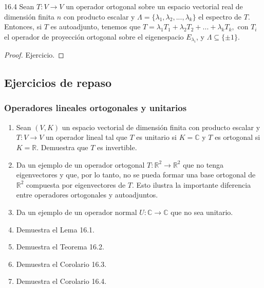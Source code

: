 \documentclass[12pt,libertine]{book}
\begin{document}
\begin{Coro} {16.4}
    Sean $T:V\to V$ un operador ortogonal sobre un espacio vectorial real de dimensión finita $n$ con producto escalar y $\Lambda=\{\lambda_1,\lambda_2,... , \lambda_k\}$ el espectro de $T$. Entonces, si $T$ es autoadjunto, tenemos que $T = \lambda_1 T_1 + \lambda_2 T_2 + ... + \lambda_k T_k,$ con $T_i$ el operador de proyección ortogonal sobre el eigenespacio $E_{\lambda_i}$, y $\Lambda\subseteq\{\pm 1\}$.

    \begin{proof}
        Ejercicio.
    \end{proof}
       
\end{Coro}

\subsection*{Ejercicios de repaso}

\subsubsection*{Operadores lineales ortogonales y unitarios}

\begin{enumerate}
    \item Sean $(V,K)$ un espacio vectorial de dimensión finita con producto escalar y $T:V\to V$ un operador lineal tal que $T$ es unitario si $K=\mathbb{C}$ y $T$ es ortogonal si $K=\mathbb{R}$. Demuestra que $T$ es invertible.
    \item Da un ejemplo de un operador ortogonal $T:\mathbb{R}^2\to \mathbb{R}^2$ que no tenga eigenvectores y que, por lo tanto, no se pueda formar una base ortogonal de $\mathbb{R}^2$ compuesta por eigenvectores de $T$. Esto ilustra la importante diferencia entre operadores ortogonales y autoadjuntos.
    \item Da un ejemplo de un operador normal $U:\mathbb{C}\to \mathbb{C}$ que no sea unitario.
    \item Demuestra el Lema 16.1.
    \item Demuestra el Teorema 16.2.
    \item Demuestra el Corolario 16.3.
    \item Demuestra el Corolario 16.4.
\end{enumerate}
\end{document}
